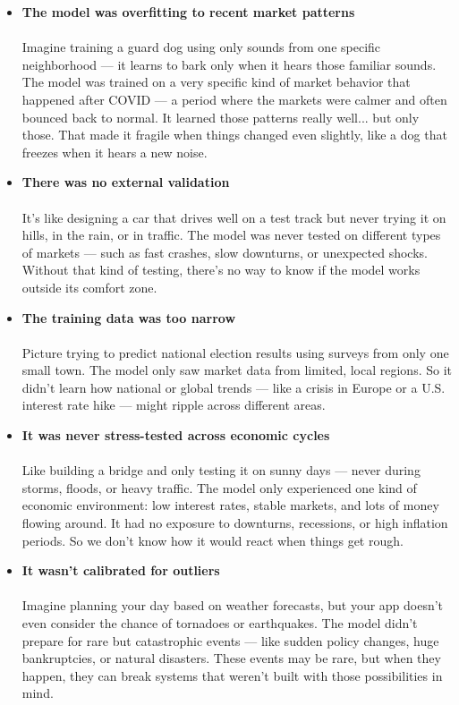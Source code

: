 \begin{itemize}
  \item \textbf{The model was overfitting to recent market patterns} \\
  \\
  Imagine training a guard dog using only sounds from one specific neighborhood — it learns to bark only when it hears those familiar sounds.  
  The model was trained on a very specific kind of market behavior that happened after COVID — a period where the markets were calmer and often bounced back to normal. It learned those patterns really well... but only those. That made it fragile when things changed even slightly, like a dog that freezes when it hears a new noise.

  \item \textbf{There was no external validation} \\
  \\
  It’s like designing a car that drives well on a test track but never trying it on hills, in the rain, or in traffic.  
  The model was never tested on different types of markets — such as fast crashes, slow downturns, or unexpected shocks. Without that kind of testing, there's no way to know if the model works outside its comfort zone.

  \item \textbf{The training data was too narrow} \\
  \\
  Picture trying to predict national election results using surveys from only one small town.  
  The model only saw market data from limited, local regions. So it didn’t learn how national or global trends — like a crisis in Europe or a U.S. interest rate hike — might ripple across different areas.

  \item \textbf{It was never stress-tested across economic cycles} \\
  \\
  Like building a bridge and only testing it on sunny days — never during storms, floods, or heavy traffic.  
  The model only experienced one kind of economic environment: low interest rates, stable markets, and lots of money flowing around. It had no exposure to downturns, recessions, or high inflation periods. So we don’t know how it would react when things get rough.

  \item \textbf{It wasn’t calibrated for outliers} \\
  \\
  Imagine planning your day based on weather forecasts, but your app doesn’t even consider the chance of tornadoes or earthquakes.  
  The model didn’t prepare for rare but catastrophic events — like sudden policy changes, huge bankruptcies, or natural disasters. These events may be rare, but when they happen, they can break systems that weren’t built with those possibilities in mind.
\end{itemize}


